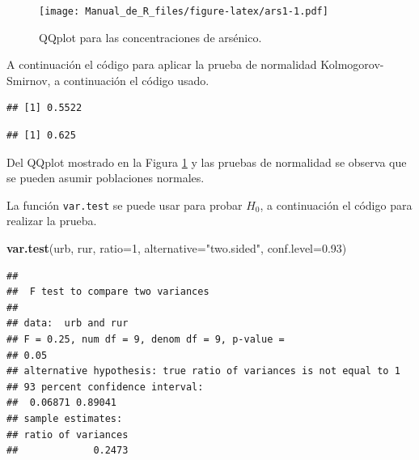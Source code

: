 \documentclass[10pt,]{krantz}
\makeatletter
\newenvironment{Shaded}{\begin{snugshade}}{\end{snugshade}}
\newcommand{\KeywordTok}[1]{\textcolor[rgb]{0.13,0.29,0.53}{\textbf{{#1}}}}
\newcommand{\DataTypeTok}[1]{\textcolor[rgb]{0.13,0.29,0.53}{{#1}}}
\newcommand{\DecValTok}[1]{\textcolor[rgb]{0.00,0.00,0.81}{{#1}}}
\newcommand{\FloatTok}[1]{\textcolor[rgb]{0.00,0.00,0.81}{{#1}}}
\newcommand{\StringTok}[1]{\textcolor[rgb]{0.31,0.60,0.02}{{#1}}}
\newcommand{\CommentTok}[1]{\textcolor[rgb]{0.56,0.35,0.01}{\textit{{#1}}}}
\newcommand{\NormalTok}[1]{{#1}}
\newenvironment{kframe}{%
\medskip{}
\setlength{\fboxsep}{.8em}
 \def\at@end@of@kframe{}%
 \ifinner\ifhmode%
  \def\at@end@of@kframe{\end{minipage}}%
  \begin{minipage}{\columnwidth}%
 \fi\fi%
 \def\FrameCommand##1{\hskip\@totalleftmargin \hskip-\fboxsep
 \colorbox{shadecolor}{##1}\hskip-\fboxsep
     \hskip-\linewidth \hskip-\@totalleftmargin \hskip\columnwidth}%
 \MakeFramed {\advance\hsize-\width
   \@totalleftmargin\z@ \linewidth\hsize
   \@setminipage}}%
 {\par\unskip\endMakeFramed%
 \at@end@of@kframe}
\renewenvironment{Shaded}{\begin{kframe}}{\end{kframe}}
\makeatother
\begin{document}
\begin{figure}[htbp]
\centering
\texttt{[image: Manual\_de\_R\_files/figure-latex/ars1-1.pdf]}
\caption{\label{fig:ars1}QQplot para las concentraciones de arsénico.}
\end{figure}

A continuación el código para aplicar la prueba de normalidad
Kolmogorov-Smirnov, a continuación el código usado.

\begin{Shaded}
\end{Shaded}

\begin{verbatim}
## [1] 0.5522
\end{verbatim}

\begin{Shaded}
\end{Shaded}

\begin{verbatim}
## [1] 0.625
\end{verbatim}

Del QQplot mostrado en la Figura \ref{fig:ars1} y las pruebas de
normalidad se observa que se pueden asumir poblaciones normales.

La función \texttt{var.test} se puede usar para probar \(H_0\), a
continuación el código para realizar la prueba.

\begin{Shaded}
\begin{Highlighting}[]
\KeywordTok{var.test}\NormalTok{(urb, rur, }\DataTypeTok{ratio=}\DecValTok{1}\NormalTok{, }\DataTypeTok{alternative=}\StringTok{"two.sided"}\NormalTok{,}
         \DataTypeTok{conf.level=}\FloatTok{0.93}\NormalTok{)}
\end{Highlighting}
\end{Shaded}

\begin{verbatim}
## 
##  F test to compare two variances
## 
## data:  urb and rur
## F = 0.25, num df = 9, denom df = 9, p-value =
## 0.05
## alternative hypothesis: true ratio of variances is not equal to 1
## 93 percent confidence interval:
##  0.06871 0.89041
## sample estimates:
## ratio of variances 
##             0.2473
\end{verbatim}
\end{document}
